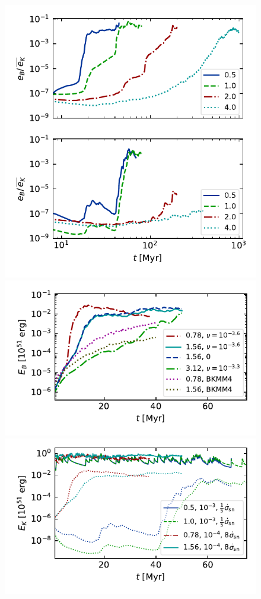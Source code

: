 \documentclass[preprint2]{aastex63}
\begin{document}
\begin{figure}
  \centering
  \includegraphics[trim=0.1cm 0.2cm  0.3cm 0.2cm, clip=true,width=\columnwidth]{figs/eB-res-4eta.pdf}
  \includegraphics[trim=0.1cm 1.0cm  0.2cm 0.2cm, clip=true,width=\columnwidth]{figs/eB-Bals.pdf}
  \includegraphics[trim=0.1cm 0.5cm  0.2cm 0.2cm, clip=true,width=\columnwidth]{figs/eK-Ma.pdf}

\end{figure}
\end{document}

